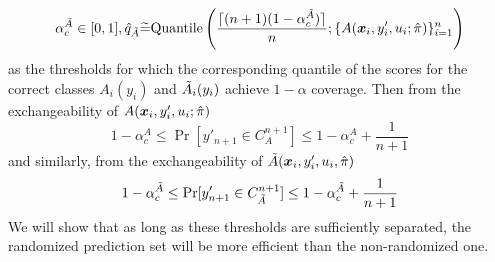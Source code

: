\[
    \alpha_c^{\Tilde{A}} \in [0, 1], \hat{q}_{\Tilde{A}} \widetilde{=} \text{Quantile}\left( \frac{\lceil(n+1)(1 - \alpha_c^{\Tilde{A}})\rceil}{n}; \{A({\bm{x}}_i, y'_i, u_i; \hat{\pi})\}_{i=1}^n \right)
\]    
as the thresholds for which the corresponding quantile of the scores for the correct classes $A_i(y_i)$ and $\Tilde{A}_i(y_i)$ achieve $1-\alpha$ coverage.
Then from the exchangeability of $A({\bm{x}}_i, y'_i, u_i; \hat{\pi})$
\[
    1 - \alpha_c^A \leq \Pr[y'_{n+1} \in C_{A}^{n+1}] \leq 1 - \alpha_c^A + \frac{1}{n+1}
\]
and similarly, from the exchangeability of $\Tilde{A}({\bm{x}}_i, y'_i, u_i, \hat{\pi})$
\[
    1 - \alpha_c^{\Tilde{A}} \leq \Pr[y'_{n+1} \in C_{\Tilde{A}}^{n+1}] \leq 1 - \alpha_c^{\Tilde{A}} + \frac{1}{n+1}
\]
We will show that as long as these thresholds are sufficiently separated, the randomized prediction set will be more efficient than the non-randomized one. 

